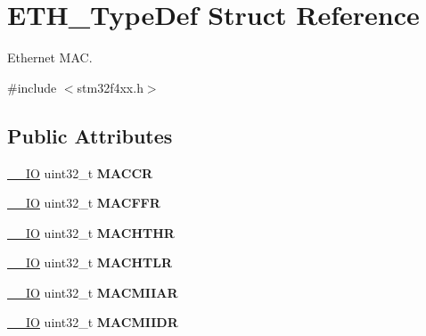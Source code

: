\hypertarget{struct_e_t_h___type_def}{}\section{E\+T\+H\+\_\+\+Type\+Def Struct Reference}
\label{struct_e_t_h___type_def}


Ethernet M\+AC.  




{\ttfamily \#include $<$stm32f4xx.\+h$>$}

\subsection*{Public Attributes}
\begin{DoxyCompactItemize}
\item 
\hyperlink{core__cm4_8h_aec43007d9998a0a0e01faede4133d6be}{\+\_\+\+\_\+\+IO} uint32\+\_\+t {\bfseries M\+A\+C\+CR}\hypertarget{struct_e_t_h___type_def_a68d7e7c68b5b8adcf7b2b96bc1eea7d9}{}\label{struct_e_t_h___type_def_a68d7e7c68b5b8adcf7b2b96bc1eea7d9}

\item 
\hyperlink{core__cm4_8h_aec43007d9998a0a0e01faede4133d6be}{\+\_\+\+\_\+\+IO} uint32\+\_\+t {\bfseries M\+A\+C\+F\+FR}\hypertarget{struct_e_t_h___type_def_afdf573860dd5dcd13f2b6b19dcb92cc1}{}\label{struct_e_t_h___type_def_afdf573860dd5dcd13f2b6b19dcb92cc1}

\item 
\hyperlink{core__cm4_8h_aec43007d9998a0a0e01faede4133d6be}{\+\_\+\+\_\+\+IO} uint32\+\_\+t {\bfseries M\+A\+C\+H\+T\+HR}\hypertarget{struct_e_t_h___type_def_ace541cc94118ec2db7c930a44960aa18}{}\label{struct_e_t_h___type_def_ace541cc94118ec2db7c930a44960aa18}

\item 
\hyperlink{core__cm4_8h_aec43007d9998a0a0e01faede4133d6be}{\+\_\+\+\_\+\+IO} uint32\+\_\+t {\bfseries M\+A\+C\+H\+T\+LR}\hypertarget{struct_e_t_h___type_def_a22bd30c653a4c1c8f46a59e0a821dcf8}{}\label{struct_e_t_h___type_def_a22bd30c653a4c1c8f46a59e0a821dcf8}

\item 
\hyperlink{core__cm4_8h_aec43007d9998a0a0e01faede4133d6be}{\+\_\+\+\_\+\+IO} uint32\+\_\+t {\bfseries M\+A\+C\+M\+I\+I\+AR}\hypertarget{struct_e_t_h___type_def_af697fcc940139f7dcb483766420852be}{}\label{struct_e_t_h___type_def_af697fcc940139f7dcb483766420852be}

\item 
\hyperlink{core__cm4_8h_aec43007d9998a0a0e01faede4133d6be}{\+\_\+\+\_\+\+IO} uint32\+\_\+t {\bfseries M\+A\+C\+M\+I\+I\+DR}\hypertarget{struct_e_t_h___type_def_a3d4c60bb689285b937c939b36a1233a3}{}\label{struct_e_t_h___type_def_a3d4c60bb689285b937c939b36a1233a3}


\end{DoxyCompactItemize}
